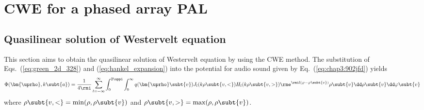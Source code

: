\section{CWE for a phased array PAL}
\label{sec:cwe_pal}
\subsection{Quasilinear solution of Westervelt equation}
This section aims to obtain the quasilinear solution of Westervelt equation by using the CWE method.
The substitution of Eqs.~(\ref{eq:green_2d_328}) and (\ref{eq:hankel_expansion}) into the potential for audio sound given by Eq.~(\ref{eq:chap3:902jfd}) yields
\begin{equation}
    \Phi(\bm{\uprho},k\subt{a})
    = \frac{1}{4\rmi }
    \sum_{l=-\infty}^\infty
    \int_0^{2\uppi}
    \int_0^\infty
    q(\bm{\uprho}\subt{v})
    J_l(k\rho\subt{v,<})
    H_l(k\rho\subt{v,>})
    \rme^{\rmi l (\varphi-\varphi\subt{v})}
    \rho\subt{v}
    \dd\rho\subt{v}
    \dd\varphi\subt{v}
    \label{eq:12031mfsd}
\end{equation}
where $\rho\subt{v,<} = \min(\rho,\rho\subt{v})$ and $\rho\subt{v,>} = \max(\rho,\rho\subt{v})$.

